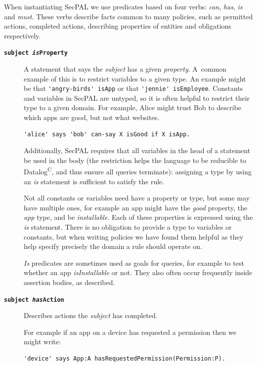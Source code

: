 \documentclass[thesis.tex]{subfiles}
\begin{document}
When instantiating SecPAL we use predicates based on four verbs: \emph{can},
\emph{has}, \emph{is} and \emph{must}.  These verbs describe facts common to
many policies, such as permitted actions, completed actions, describing
properties of entities and obligations respectively.  
%
\begin{description}
\item[\bfseries\texttt{subject \emph{is}Property}]
  A statement that says the \emph{subject} has a given \emph{property}.
  A~common example of this is to restrict variables to a given type.
  An example might be that \lstinline!'angry-birds' isApp! or that \lstinline!'jennie' isEmployee!.
  Constants and variables in SecPAL are untyped, so it is
  often helpful to restrict their type to a given domain.  For example, Alice
  might trust Bob to describe which apps are good, but not what websites.
  \begin{lstlisting}
'alice' says 'bob' can-say X isGood if X isApp.
  \end{lstlisting}
  Additionally, SecPAL requires that all variables in the head of a
  statement be used in the body (the restriction helps the language to
  be reducible to Datalog\textsuperscript{C}, and thus ensure all
  queries terminate): assigning a type by using an \emph{is} statement
  is sufficient to satisfy the rule.

  Not all constants or variables need have a property or type, but
  some may have multiple ones, for example an app might have the
  \emph{good} property, the \emph{app} type, and be \emph{installable}.
  Each of these properties is expressed using the \emph{is} statement.
  There is no obligation to provide a type to variables or constants,
  but when writing policies we have found them helpful as they help
  specify precisely the domain a rule should operate on.

  \emph{Is} predicates are sometimes used as goals for queries, for
  example to test whether an app \emph{isInstallable} or not.  They also
  often occur frequently inside assertion bodies, as described.

\item[\bfseries\texttt{subject \emph{has}Action}]
  Describes actions the \emph{subject} has completed.

  For example if an app on a device has requested a permission then we might write:

  \begin{lstlisting}
'device' says App:A hasRequestedPermission(Permission:P).
  \end{lstlisting}


\end{description}
\end{document}
